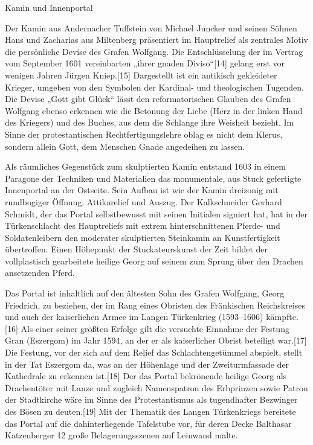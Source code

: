 \documentclass[
  letterpaper,
]{book}
\begin{document}
Kamin und Innenportal

Der Kamin aus Andernacher Tuffstein von Michael Juncker und seinen
Söhnen Hans und Zacharias aus Miltenberg präsentiert im Hauptrelief als
zentrales Motiv die persönliche Devise des Grafen Wolfgang. Die
Entschlüsselung der im Vertrag vom September 1601 vereinbarten „ihrer
gnaden Diviso``{[}14{]} gelang erst vor wenigen Jahren Jürgen
Kniep.{[}15{]} Dargestellt ist ein antikisch gekleideter Krieger,
umgeben von den Symbolen der Kardinal- und theologischen Tugenden. Die
Devise „Gott gibt Glück`` lässt den reformatorischen Glauben des Grafen
Wolfgang ebenso erkennen wie die Betonung der Liebe (Herz in der linken
Hand des Kriegers) und des Buches, aus dem die Schlange ihre Weisheit
bezieht. Im Sinne der protestantischen Rechtfertigungslehre oblag es
nicht dem Klerus, sondern allein Gott, dem Menschen Gnade angedeihen zu
lassen.

Als räumliches Gegenstück zum skulptierten Kamin entstand 1603 in einem
Paragone der Techniken und Materialien das monumentale, aus Stuck
gefertigte Innenportal an der Ostseite. Sein Aufbau ist wie der Kamin
dreizonig mit rundbogiger Öffnung, Attikarelief und Auszug. Der
Kalkschneider Gerhard Schmidt, der das Portal selbstbewusst mit seinen
Initialen signiert hat, hat in der Türkenschlacht des Hauptreliefs mit
extrem hinterschnittenen Pferde- und Soldatenleibern den moderater
skulptierten Steinkamin an Kunstfertigkeit übertroffen. Einen Höhepunkt
der Stuckateurskunst der Zeit bildet der vollplastisch gearbeitete
heilige Georg auf seinem zum Sprung über den Drachen ansetzenden Pferd.

Das Portal ist inhaltlich auf den ältesten Sohn des Grafen Wolfgang,
Georg Friedrich, zu beziehen, der im Rang eines Obristen des Fränkischen
Reichskreises und auch der kaiserlichen Armee im Langen Türkenkrieg
(1593--1606) kämpfte.{[}16{]} Als einer seiner größten Erfolge gilt die
versuchte Einnahme der Festung Gran (Eszergom) im Jahr 1594, an der er
als kaiserlicher Obrist beteiligt war.{[}17{]} Die Festung, vor der sich
auf dem Relief das Schlachtengetümmel abspielt, stellt in der Tat
Eszergom da, was an der Höhenlage und der Zweiturmfassade der Kathedrale
zu erkennen ist.{[}18{]} Der das Portal bekrönende heilige Georg als
Drachentöter mit Lanze und zugleich Namenspatron des Erbprinzen sowie
Patron der Stadtkirche wäre im Sinne des Protestantismus als
tugendhafter Bezwinger des Bösen zu deuten.{[}19{]} Mit der Thematik des
Langen Türkenkriegs bereitete das Portal auf die dahinterliegende
Tafelstube vor, für deren Decke Balthasar Katzenberger 12 große
Belagerungsszenen auf Leinwand malte.
\end{document}
